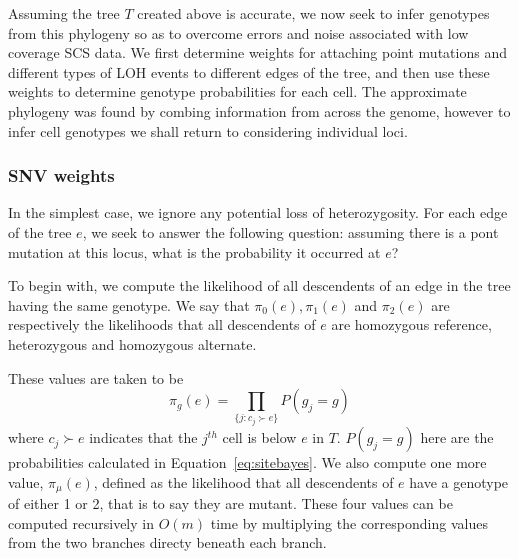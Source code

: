 \documentclass[../../main.tex]{subfiles}
\begin{document}
Assuming the tree $T$ created above is accurate, we now seek to infer genotypes from this phylogeny so as to overcome errors and noise associated with low coverage SCS data.
We first determine weights for attaching point mutations and different types of LOH events to different edges of the tree, and then use these weights to determine genotype probabilities for each cell.
The approximate phylogeny was found by combing information from across the genome, however to infer cell genotypes we shall return to considering individual loci.

\subsubsection{SNV weights}
In the simplest case, we ignore any potential loss of heterozygosity.
For each edge of the tree $e$, we seek to answer the following question: assuming there is a pont mutation at this locus, what is the probability it occurred at $e$?

To begin with, we compute the likelihood of all descendents of an edge in the tree having the same genotype.
We say that $\pi_0(e), \pi_1(e)$ and $\pi_2(e)$ are respectively the likelihoods that all descendents of $e$ are homozygous reference, heterozygous and homozygous alternate.

These values are taken to be
\begin{equation}
\pi_g(e) = \prod_{\{j:c_j\succ e\}} P(g_j = g)
\end{equation}
where $c_j\succ e$ indicates that the $j^{th}$ cell is below $e$ in $T$.
$P(g_j = g)$ here are the probabilities calculated in Equation~\eqref{eq:sitebayes}.
We also compute one more value, $\pi_\mu(e)$, defined as the likelihood that all descendents of $e$ have a genotype of either 1 or 2, that is to say they are mutant.
These four values can be computed recursively in $O(m)$ time by multiplying the corresponding values from the two branches directy beneath each branch.
\end{document}
